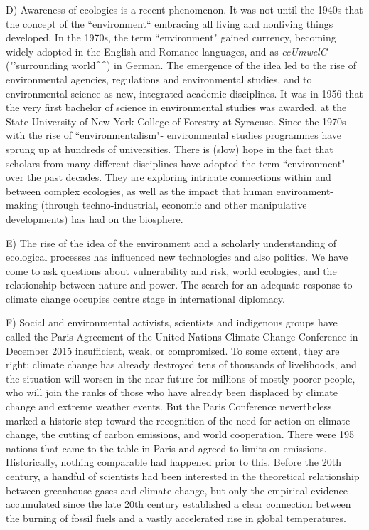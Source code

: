\documentclass[UTF8,11pt]{ctexart}
\begin{document}
D) Awareness of ecologies is a recent phenomenon. It was not until the 1940s that the concept of the “environment“ embracing all living and nonliving things developed. In the 1970s, the term “environment" gained currency, becoming widely adopted in the English and Romance languages, and as \textit{ccUmwelC} ("'surrounding world\textasciicircum{}\textasciicircum{}) in German. The emergence of the idea led to the rise of environmental agencies, regulations and environmental studies, and to environmental science as new, integrated academic disciplines. It was in 1956 that the very first bachelor of science in environmental studies was awarded, at the State University of New York College of Forestry at Syracuse. Since the 1970s- with the rise of “environmentalism"- environmental studies programmes have sprung up at hundreds of universities. There is (slow) hope in the fact that scholars from many different disciplines have adopted the term “environment" over the past decades. They are exploring intricate connections within and between complex ecologies, as well as the impact that human environment-making (through techno-industrial, economic and other manipulative developments) has had on the biosphere.


E) The rise of the idea of the environment and a scholarly understanding of ecological processes has influenced new technologies and also politics. We have come to ask questions about vulnerability and risk, world ecologies, and the relationship between nature and power. The search for an adequate response to climate change occupies centre stage in international diplomacy.


F) Social and environmental activists, scientists and indigenous groups have called the Paris Agreement of the United Nations Climate Change Conference in December 2015 insufficient, weak, or compromised. To some extent, they are right: climate change has already destroyed tens of thousands of livelihoods, and the situation will worsen in the near future for millions of mostly poorer people, who will join the ranks of those who have already been displaced by climate change and extreme weather events. But the Paris Conference nevertheless marked a historic step toward the recognition of the need for action on climate change, the cutting of carbon emissions, and world cooperation. There were 195 nations that came to the table in Paris and agreed to limits on emissions. Historically, nothing comparable had happened prior to this. Before the 20th century, a handful of scientists had been interested in the theoretical relationship between greenhouse gases and climate change, but only the empirical evidence accumulated since the late 20th century established a clear connection between the burning of fossil fuels and a vastly accelerated rise in global temperatures.
\end{document}
